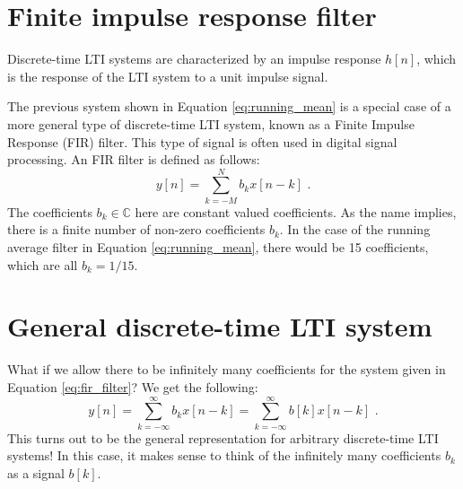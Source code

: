 \section{Finite impulse response filter}
\begin{marginfigure}

\begin{center}
\end{center}
\caption{Discrete-time LTI systems are characterized by an impulse response $h[n]$, which is the response of the LTI system to a unit impulse signal.}
\end{marginfigure}

The previous system shown in Equation \ref{eq:running_mean} is a special case of a more general type of discrete-time LTI system, 
known as a Finite Impulse Response (FIR) filter. This type of signal is often used in digital signal processing. 
An FIR filter is defined as follows:
\begin{equation}
  \boxed{
    y[n] = \sum_{k=-M}^{N} b_k x[n-k]\,\,.
  }
  \label{eq:fir_filter}
\end{equation}
The coefficients $b_k \in \mathbb{C}$ here are constant valued coefficients. As the name implies, there is a finite number of non-zero coefficients $b_k$. 
In the case of the running average filter in Equation \ref{eq:running_mean}, there would be 15 coefficients, which are all $b_k=1/15$.

\section{General discrete-time LTI system}
What if we allow there to be infinitely many coefficients for the system given in Equation \ref{eq:fir_filter}? We get the following:
\begin{equation}
    y[n] = \sum_{k=-\infty}^{\infty} b_k x[n-k] = \sum_{k=-\infty}^{\infty} b[k] x[n-k]\,\,.
\end{equation}
This turns out to be the general representation for arbitrary discrete-time LTI systems! In this case, it makes sense to think of the infinitely many coefficients $b_k$ as a signal $b[k]$.

